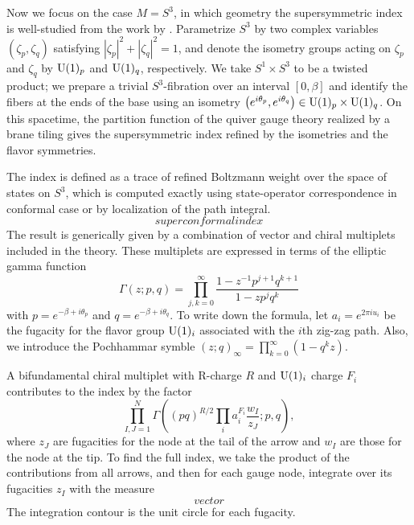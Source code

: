Now we focus on the case $M=S^{3}$, in which geometry the supersymmetric
index is well-studied from the work by \cite{Romelsberger:2005eg,Kinney:2005ej,Festuccia:2011ws}. Parametrize $S^{3}$ by two complex variables
$\left(\zeta_{p},\zeta_{q}\right)$ satisfying $\left|\zeta_{p}\right|^{2}+\left|\zeta_{q}\right|^{2}=1$,
and denote the isometry groups acting on $\zeta_{p}$ and $\zeta_{q}$
by $\mathrm{U}(1)_{p}$ and $\mathrm{U}(1)_{q}$, respectively. We take $S^{1}\times S^{3}$
to be a twisted product; we prepare a trivial $S^{3}$-fibration over
an interval $[0,\beta]$ and identify the fibers at the ends of the
base using an isometry $\left(e^{i\theta_{p}},e^{i\theta_{q}}\right)\in \mathrm{U}(1)_{p}\times \mathrm{U}(1)_{q}$.
On this spacetime, the partition function of the quiver gauge theory
realized by a brane tiling gives the supersymmetric index refined
by the isometries and the flavor symmetries.

The index is defined as a trace of refined Boltzmann weight over the
space of states on $S^{3}$, which is computed exactly using state-operator
correspondence in conformal case or by localization of the path integral.
\begin{equation}
    superconformalindex
\end{equation}
The result is generically given by a combination of vector and chiral
multiplets included in the theory. These multiplets are expressed
in terms of the elliptic gamma function
\begin{equation}
    \Gamma\left(z;p,q\right)  =  \prod_{j,k=0}^{\infty}  \frac{1-z^{-1}p^{j+1}q^{k+1}}{1-zp^{j}q^{k}}
\end{equation}
with $p=e^{-\beta+i\theta_{p}}$ and $q=e^{-\beta+i\theta_{q}}$.
To write down the formula, let $a_{i}=e^{2\pi iu_{i}}$ be the fugacity
for the flavor group $\mathrm{U}(1)_i$ associated with the $i$th zig-zag path.
Also, we introduce the Pochhammar symble $\left(z;q\right)_{\infty}=\prod_{k=0}^{\infty}\left(1-q^{k}z\right)$.

A bifundamental chiral multiplet with R-charge $R$ and $\mathrm{U}(1)_i$ charge
$F_{i}$ contributes to the index by the factor
\begin{equation}
    \prod_{I,J=1}^{N}  \Gamma\left((pq)^{R/2}\prod_{i}a_{i}^{F_{i}}\frac{w_{I}}{z_{J}};p,q\right),
\end{equation}
 where $z_{J}$ are fugacities for the node at the tail of the arrow
and $w_{I}$ are those for the node at the tip. To find the full index,
we take the product of the contributions from all arrows, and then
for each gauge node, integrate over its fugacities $z_{I}$ with the
measure
\begin{equation}
vector
\end{equation}
 The integration contour is the unit circle for each fugacity.

